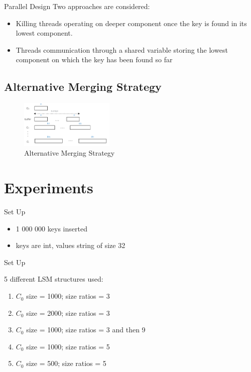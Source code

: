 \documentclass[pdf]{beamer}
\begin{document}
\begin{frame}{Parallel Design}
Two approaches are considered:
\begin{itemize}
	\item Killing threads operating on deeper component once the key is found in its lowest component.
	\item Threads communication through a shared variable storing the lowest component on which the key has been found so far
\end{itemize}
\end{frame}



\subsection{Alternative Merging Strategy}

\begin{frame}
\begin{figure}[H]
\begin{center}
    \includegraphics[width=0.4\textwidth]{varlsm}
    \caption{Alternative Merging Strategy}
\end{center}
\end{figure}
\end{frame}

\section{Experiments}

\begin{frame}{Set Up}
\begin{itemize}
	\item 1 000 000 keys inserted
	\item keys are int, values string of size 32
\end{itemize}
\end{frame}

\begin{frame}{Set Up}

5 different LSM structures used:
\begin{enumerate}
	\item $C_0$ size = 1000; size ratios  = 3
	\item $C_0$ size = 2000; size ratios = 3
	\item $C_0$ size = 1000; size ratios = 3 and then 9
	\item $C_0$ size = 1000; size ratios = 5
	\item $C_0$ size = 500; size ratios = 5
\end{enumerate}

\end{frame}
\end{document}
